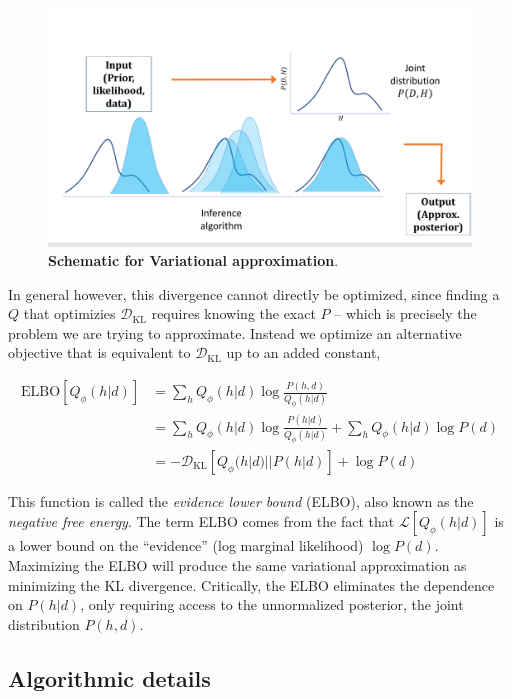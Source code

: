 \begin{figure}
\centering
\includegraphics[width = \textwidth]{figures/variational_schematic.pdf}
\caption{\textbf{Schematic for Variational approximation}. }
\label{fig:var_schematic}
\end{figure}

In general however, this divergence cannot directly be optimized, since finding a $Q$ that optimizies $\mathcal{D}_{\text{KL}}$ requires knowing the exact $P$ -- which is precisely the problem we are trying to approximate. Instead we optimize an alternative objective that is equivalent to $\mathcal{D}_{\text{KL}}$ up to an added constant,

\begin{align}
\text{ELBO}[Q_\phi(h|d)] &=  \sum_h Q_\phi(h|d) \log \frac{P(h,d)}{Q_\phi(h|d)} \\
& = \sum_h Q_\phi(h|d) \log \frac{P(h|d)}{Q_\phi(h|d)} + \sum_h Q_\phi(h|d) \log P(d) \\
& = - \mathcal{D}_{\text{KL}}[Q_\phi(h|d)||P(h|d)]  + \log P(d)
\label{eq:ELBO}
\end{align}

This function is called the \emph{evidence lower bound} (ELBO), also known as the \emph{negative free energy}. The term ELBO comes from the fact that $\mathcal{L}[Q_\phi(h|d)]$ is a lower bound on the ``evidence'' (log marginal likelihood) $\log P(d)$. Maximizing the ELBO will produce the same variational approximation as minimizing the KL divergence. Critically, the ELBO eliminates the dependence on $P(h|d)$, only requiring access to the unnormalized posterior, the joint distribution $P(h,d)$.


\subsection{Algorithmic details}

